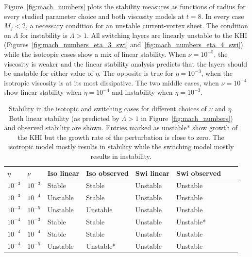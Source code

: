 Figure~\ref{fig:mach_numbers} plots the stability measures as functions of radius for every studied parameter choice and both viscosity models at $t=8$. In every case $M_f < 2$, a necessary condition for an unstable current-vortex sheet. The condition on $\Lambda$ for instability is $\Lambda > 1$. All switching layers are linearly unstable to the KHI (Figures~\ref{fig:mach_numbers_eta_3_swi} and~\ref{fig:mach_numbers_eta_4_swi}) while the isotropic cases show a mix of linear stability. When $\nu = 10^{-5}$, the viscosity is weaker and the linear stability analysis predicts that the layers should be unstable for either value of $\eta$. The opposite is true for $\eta=10^{-3}$, when the isotropic viscosity is at its most dissipative. The two middle cases, when $\nu=10^{-4}$ show linear stability when $\eta=10^{-4}$ and instability when $\eta=10^{-3}$.

\begin{table}[]
\centering
\begin{tabular}{llllllll}
$\eta$    & $\nu$     & Iso linear & Iso observed & Swi linear & Swi observed  \\
\midrule
$10^{-3}$ & $10^{-3}$ & Stable     & Stable       & Unstable   & Unstable         & \\
$10^{-3}$ & $10^{-4}$ & Unstable   & Stable       & Unstable   & Unstable         & \\
$10^{-3}$ & $10^{-5}$ & Unstable   & Unstable     & Unstable   & Unstable         & \\
$10^{-4}$ & $10^{-3}$ & Stable     & Stable       & Unstable   & Unstable*         & \\
$10^{-4}$ & $10^{-4}$ & Stable     & Stable       & Unstable   & Unstable         & \\
$10^{-4}$ & $10^{-5}$ & Unstable   & Unstable*     & Unstable   & Unstable         &
\end{tabular}
\caption{Stability in the isotopic and switching cases for different choices of $\nu$ and $\eta$. Both linear stability (as predicted by $\Lambda > 1$ in Figure~\ref{fig:mach_numbers}) and observed stability are shown. Entries marked as unstable* show growth of the KHI but the growth rate of the perturbation is close to zero. The isotropic model mostly results in stability while the switching model mostly results in instability.}
\label{tab:stability}
\end{table}

